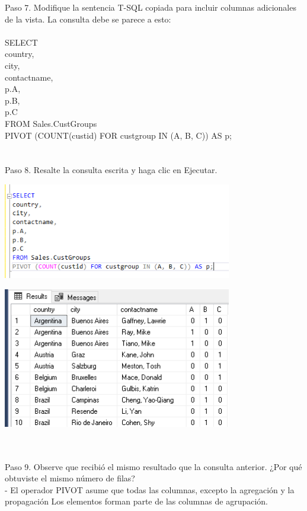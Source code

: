 \begin{flushleft}
Paso 7. Modifique la sentencia T-SQL copiada para incluir columnas adicionales de la vista. La consulta debe se parece a esto:\\
\textbf{}\\
SELECT\\
country,\\
city,\\
contactname,\\
p.A,\\
p.B,\\
p.C\\
FROM Sales.CustGroups\\
PIVOT (COUNT(custid) FOR custgroup IN (A, B, C)) AS p; \\
\textbf{}\\
\textbf{}\\
Paso 8. Resalte la consulta escrita y haga clic en Ejecutar.
\begin{center}
	\includegraphics[width=10cm]{./Imagenes/2img8} 
	\end{center}

\begin{center}
	\includegraphics[width=10cm]{./Imagenes/2img81} 
	\end{center}
\textbf{}\\
\textbf{}\\
Paso 9. Observe que recibió el mismo resultado que la consulta anterior. ¿Por qué obtuviste el mismo número de filas?\\
- El operador PIVOT asume que todas las columnas, excepto la agregación y la propagación
Los elementos forman parte de las columnas de agrupación.



\end{flushleft}

